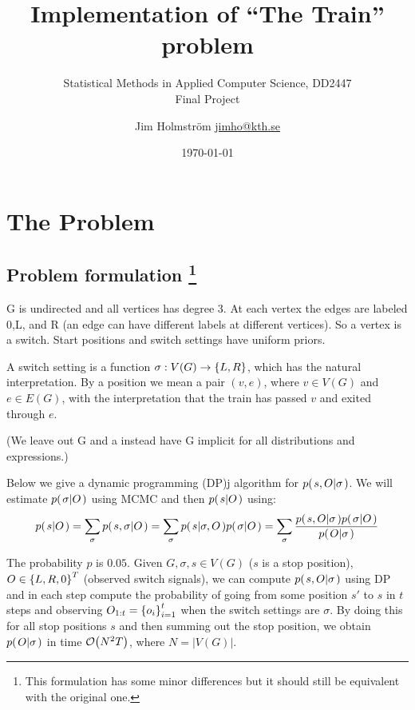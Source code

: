 \documentclass[a4paper,11pt]{kth-mag}
\title{Implementation of ``The Train'' problem}
\subtitle{Statistical Methods in Applied Computer Science, DD2447\\ Final Project}
\author{
    Jim Holmstr\"{o}m \href{mailto:jimho@kth.se}{jimho@kth.se}
}
\date{\today}
\begin{document}
    \frontmatter
    \pagestyle{empty}
    \removepagenumbers
    \maketitle
    \tableofcontents*
    \mainmatter
    \pagestyle{newchap}

    \chapter{The Problem}
        \section[problemformulation]{
            Problem formulation 
            \footnote{
                This formulation has some minor differences but it should still 
                be equivalent with the original one.
            }
        }
        G is undirected and all vertices has degree 3. At each vertex the edges
        are labeled 0,L, and R (an edge can have different labels at different
        vertices). So a vertex is a switch. Start positions and switch settings
        have uniform priors.

        A switch setting is a function $\sigma: V(G)\rightarrow\left\{{L,R}\right\}$, which
        has the natural interpretation. By a position we mean a pair $(v,e)$,
        where $v\in V(G)$ and $e\in E(G)$, with the interpretation that the
        train has passed $v$ and exited through $e$.
        
        (We leave out G and a instead have G implicit for all distributions and expressions.)

        Below we give a dynamic programming (DP)j algorithm for $p{(\left. s,O \middle\vert \sigma \right.)}$. We will
        estimate $p{(\left. \sigma \middle\vert O \right.)}$ using MCMC and then $p{(\left. s \middle\vert O \right.)}$
        using:
        \begin{equation}
            \label{eq:marginalization}
            p{(\left. s \middle\vert O \right.)} 
            = \sum\limits_\sigma
                p{(\left. s,\sigma \middle\vert O \right.)}
            = \sum\limits_\sigma
                p{(\left. s \middle\vert \sigma,O \right.)}p{(\left. \sigma \middle\vert O \right.)}
            = \sum\limits_\sigma
                \frac{
                    p{(\left. s,O \middle\vert \sigma \right.)}p{(\left. \sigma \middle\vert O \right.)}
                }{
                    p{(\left. O \middle\vert \sigma \right.)}
                }
        \end{equation}

    The probability $p$ is $0.05$. Given $G,\sigma,s\in V(G)$ ($s$ is a stop
    position), $O\in\left\{{L,R,0}\right\}^T$ (observed switch signals), we can compute 
    $p{(\left. s,O \middle\vert \sigma \right.)}$ using DP and in each step compute the probability
    of going from some position $s'$ to $s$ in $t$ steps and observing
    $O_{1:t}=\left\{{o_i}\right\}_{i=1}^t$ when the switch settings are $\sigma$. By doing this
    for all stop positions $s$ and then summing out the stop position, we
    obtain $p{(\left. O \middle\vert \sigma \right.)}$ in time $\mathcal{O}{\left(N^2T\right)}$, where $N=|V(G)|$.
\end{document}
